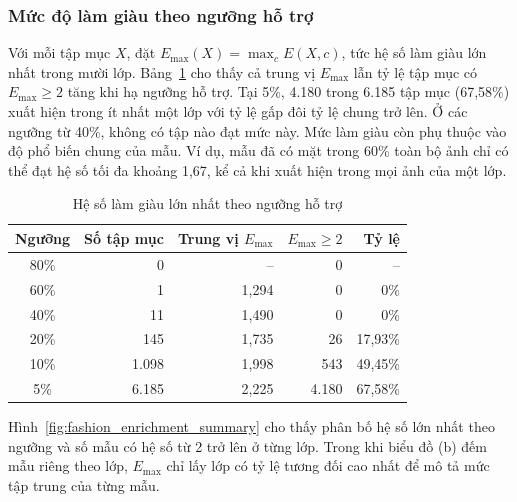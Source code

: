 \subsubsection{Mức độ làm giàu theo ngưỡng hỗ trợ}

Với mỗi tập mục $X$, đặt $E_{\max}(X)=\max_c E(X,c)$, tức hệ số làm giàu lớn nhất trong mười lớp. Bảng~\ref{tab:fashion_enrichment_thresholds} cho thấy cả trung vị $E_{\max}$ lẫn tỷ lệ tập mục có $E_{\max}\geq2$ tăng khi hạ ngưỡng hỗ trợ. Tại 5\%, 4.180 trong 6.185 tập mục (67,58\%) xuất hiện trong ít nhất một lớp với tỷ lệ gấp đôi tỷ lệ chung trở lên. Ở các ngưỡng từ 40\%, không có tập nào đạt mức này. Mức làm giàu còn phụ thuộc vào độ phổ biến chung của mẫu. Ví dụ, mẫu đã có mặt trong 60\% toàn bộ ảnh chỉ có thể đạt hệ số tối đa khoảng 1,67, kể cả khi xuất hiện trong mọi ảnh của một lớp.

\begin{table}[!t]
    \centering
    \caption{Hệ số làm giàu lớn nhất theo ngưỡng hỗ trợ}
    \label{tab:fashion_enrichment_thresholds}
    \scriptsize
    \setlength{\tabcolsep}{3pt}
    \begin{tabular}{@{}c r r r r@{}}
        \toprule
        \textbf{Ngưỡng} & \textbf{Số tập mục} & \textbf{Trung vị $E_{\max}$} &
        \textbf{$E_{\max}\geq2$} & \textbf{Tỷ lệ} \\
        \midrule
        80\% & 0 & -- & 0 & -- \\
        60\% & 1 & 1,294 & 0 & 0\% \\
        40\% & 11 & 1,490 & 0 & 0\% \\
        20\% & 145 & 1,735 & 26 & 17,93\% \\
        10\% & 1.098 & 1,998 & 543 & 49,45\% \\
         5\% & 6.185 & 2,225 & 4.180 & 67,58\% \\
        \bottomrule
    \end{tabular}
\end{table}

Hình~\ref{fig:fashion_enrichment_summary} cho thấy phân bố hệ số lớn nhất theo ngưỡng và số mẫu có hệ số từ 2 trở lên ở từng lớp. Trong khi biểu đồ (b) đếm mẫu riêng theo lớp, $E_{\max}$ chỉ lấy lớp có tỷ lệ tương đối cao nhất để mô tả mức tập trung của từng mẫu.

